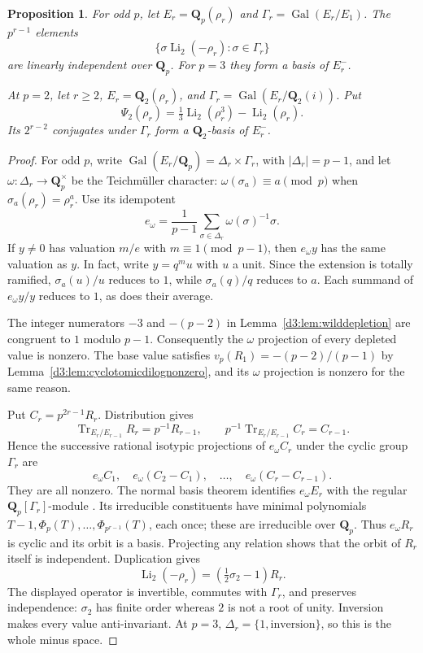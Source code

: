 \documentclass[11pt,a4paper]{amsart}
\numberwithin{equation}{section}
\newtheorem{proposition}[theorem]{Proposition}
\theoremstyle{definition}
\theoremstyle{remark}
\newcommand{\Q}{\mathbf Q}
\newcommand{\Gal}{\operatorname{Gal}}
\begin{document}
\begin{proposition}\label{d3:prop:wildorbit}
For odd $p$, let $E_r=\Q_p(\rho_r)$ and
$\Gamma_r=\Gal(E_r/E_1)$.
The $p^{r-1}$ elements
\[
 \{\sigma\operatorname{Li}_2(-\rho_r):\sigma\in\Gamma_r\}
\]
are linearly independent over $\Q_p$.
For $p=3$ they form a basis of $E_r^-$.

At $p=2$, let $r\geq2$, $E_r=\Q_2(\rho_r)$, and
$\Gamma_r=\Gal(E_r/\Q_2(i))$.
Put
\[
 \Psi_2(\rho_r)=\tfrac13\operatorname{Li}_2(\rho_r^3)
                              -\operatorname{Li}_2(\rho_r).
\]
Its $2^{r-2}$ conjugates under $\Gamma_r$ form a $\Q_2$-basis of
$E_r^-$.
\end{proposition}
\begin{proof}
For odd $p$, write
$\Gal(E_r/\Q_p)=\Delta_r\times\Gamma_r$, with $|\Delta_r|=p-1$,
and let $\omega:\Delta_r\to\Q_p^\times$ be the Teichm\"uller
character: $\omega(\sigma_a)\equiv a\pmod p$ when
$\sigma_a(\rho_r)=\rho_r^a$.
Use its idempotent
\[
 e_\omega=\frac1{p-1}\sum_{\sigma\in\Delta_r}
                        \omega(\sigma)^{-1}\sigma.
\]
If $y\ne0$ has valuation $m/e$ with $m\equiv1\pmod{p-1}$,
then $e_\omega y$ has the same valuation as $y$.
In fact, write $y=q^m u$ with $u$ a unit. Since the extension is
totally ramified, $\sigma_a(u)/u$ reduces to $1$, while
$\sigma_a(q)/q$ reduces to $a$. Each summand of $e_\omega y/y$ reduces to $1$, as does their average.

The integer numerators $-3$ and $-(p-2)$ in
Lemma~\ref{d3:lem:wilddepletion} are congruent to $1$ modulo $p-1$.
Consequently the $\omega$ projection of every depleted value is nonzero.
The base value satisfies
$v_p(R_1)=-(p-2)/(p-1)$ by
Lemma~\ref{d3:lem:cyclotomicdilognonzero}, and its $\omega$ projection
is nonzero for the same reason.

Put $C_r=p^{2r-1}R_r$.
Distribution \cite[Proposition~2.10(1)]{BesserDeJeuAlgorithm} gives
\[
 \operatorname{Tr}_{E_r/E_{r-1}}R_r=p^{-1}R_{r-1},
 \qquad p^{-1}\operatorname{Tr}_{E_r/E_{r-1}}C_r=C_{r-1}.
\]
Hence the successive rational isotypic projections of
$e_\omega C_r$ under the cyclic group $\Gamma_r$ are
\[
 e_\omega C_1,\quad e_\omega(C_2-C_1),\quad\ldots,
 \quad e_\omega(C_r-C_{r-1}).
\]
They are all nonzero. The normal basis theorem identifies
$e_\omega E_r$ with the regular $\Q_p[\Gamma_r]$-module
\cite[Chapter~I, p.~34]{MilneDuality}.
Its irreducible constituents have minimal polynomials
$T-1,\Phi_p(T),\ldots,\Phi_{p^{r-1}}(T)$, each once;
these are irreducible over $\Q_p$.
Thus $e_\omega R_r$ is cyclic and its orbit is a basis.
Projecting any relation shows that the orbit of $R_r$ itself
is independent. Duplication gives
\[
 \operatorname{Li}_2(-\rho_r)=(\tfrac12\sigma_2-1)R_r.
\]
The displayed operator is invertible, commutes with $\Gamma_r$,
and preserves independence: $\sigma_2$ has finite order whereas
$2$ is not a root of unity.
Inversion makes every value anti-invariant. At $p=3$,
$\Delta_r=\{1,\text{inversion}\}$, so this is the whole minus space.


\end{proof}
\end{document}
